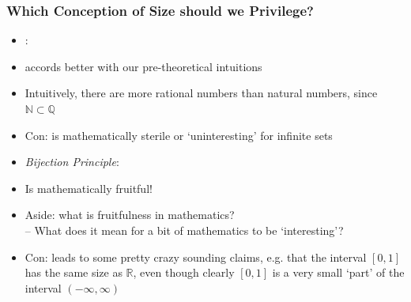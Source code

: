 \begin{frame}
\frametitle{Which Conception of Size should we Privilege?}

\begin{itemize}[<+->]

\item {}:
\bi
\item accords better with our pre-theoretical intuitions

\item Intuitively, there are more rational numbers than natural numbers, since $\mathbb{N} \subset \mathbb{Q}$

\item Con: is mathematically sterile or `uninteresting' for infinite sets

\ei

\item \emph{Bijection Principle}:
\bi

\item Is mathematically fruitful! 

\item Aside: what is fruitfulness in mathematics? \\ -- What does it mean for a bit of mathematics to be `interesting'?

\item Con: leads to some pretty crazy sounding claims, e.g. that the interval $[0, 1]$ has the same size as $\mathbb{R}$, even though clearly $[0,1]$ is a very small `part' of the interval $(-\infty, \infty)$

\ei

\end{itemize}
\end{frame}

